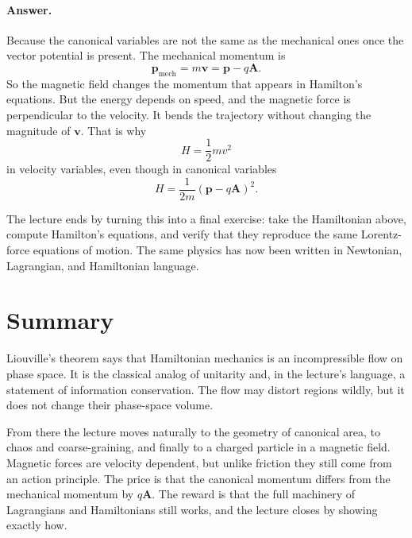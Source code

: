 \paragraph{Answer.} Because the canonical variables are not the same as the mechanical ones once the vector potential is present. The mechanical momentum is
\begin{equation}
\mathbf p_{\mathrm{mech}}=m\mathbf v=\mathbf p-q\mathbf A.
\end{equation}
So the magnetic field changes the momentum that appears in Hamilton's equations. But the energy depends on speed, and the magnetic force is perpendicular to the velocity. It bends the trajectory without changing the magnitude of \(\mathbf v\). That is why
\begin{equation}
H=\frac12 mv^2
\end{equation}
in velocity variables, even though in canonical variables
\begin{equation}
H=\frac{1}{2m}(\mathbf p-q\mathbf A)^2.
\end{equation}

The lecture ends by turning this into a final exercise: take the Hamiltonian above, compute Hamilton's equations, and verify that they reproduce the same Lorentz-force equations of motion. The same physics has now been written in Newtonian, Lagrangian, and Hamiltonian language.

\section{Summary}

Liouville's theorem says that Hamiltonian mechanics is an incompressible flow on phase space. It is the classical analog of unitarity and, in the lecture's language, a statement of information conservation. The flow may distort regions wildly, but it does not change their phase-space volume.

From there the lecture moves naturally to the geometry of canonical area, to chaos and coarse-graining, and finally to a charged particle in a magnetic field. Magnetic forces are velocity dependent, but unlike friction they still come from an action principle. The price is that the canonical momentum differs from the mechanical momentum by \(q\mathbf A\). The reward is that the full machinery of Lagrangians and Hamiltonians still works, and the lecture closes by showing exactly how.